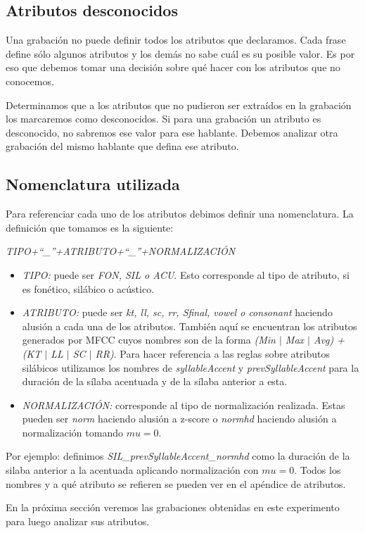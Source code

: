 \subsection{Atributos desconocidos}

Una grabación no puede definir todos los atributos que declaramos. Cada frase define sólo algunos atributos y los demás no sabe cuál es su posible valor. Es por eso que debemos tomar una decisión sobre qué hacer con los atributos que no conocemos. 

Determinamos que a los atributos que no pudieron ser extraídos en la grabación los marcaremos como desconocidos. Si para una grabación un atributo es desconocido, no sabremos ese valor para ese hablante. Debemos analizar otra grabación del mismo hablante que defina ese atributo.

\subsection{Nomenclatura utilizada}
Para referenciar cada uno de los atributos debimos definir una nomenclatura. La definición que tomamos es la siguiente:
\begin{center}
\textit{TIPO+``\_''+ATRIBUTO+``\_''+NORMALIZACIÓN} 
\end{center}

\begin{itemize}
  \item \emph{TIPO:} puede ser \emph{FON, SIL o ACU}. Esto corresponde al tipo de atributo, si es fonético, silábico o acústico.
  \item \emph{ATRIBUTO:} puede ser \emph{kt, ll, sc, rr, Sfinal, vowel o consonant} haciendo alusión a cada una de los atributos. También aquí se encuentran los atributos generados por MFCC cuyos nombres son de la forma \emph{(Min $|$ Max $|$ Avg) + (KT $|$ LL $|$ SC $|$ RR)}. Para hacer referencia a las reglas sobre atributos silábicos utilizamos los nombres de \emph{syllableAccent} y \emph{prevSyllableAccent} para la duración de la sílaba acentuada y de la sílaba anterior a esta.
  \item \emph{NORMALIZACIÓN:} corresponde al tipo de normalización realizada. Estas pueden ser \emph{norm} haciendo alusión a z-score o \emph{normhd} haciendo alusión a normalización tomando $mu=0$.
\end{itemize}
 
Por ejemplo: definimos \textit{SIL\_prevSyllableAccent\_normhd} como la duración de la silaba anterior a la acentuada aplicando normalización con $mu=0$. Todos los nombres y a qué atributo se refieren se pueden ver en el apéndice de atributos.

En la próxima sección veremos las grabaciones obtenidas en este experimento para luego analizar sus atributos.